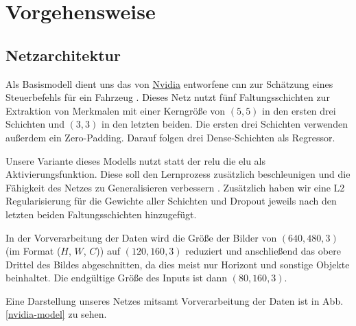 \chapter{Vorgehensweise}

\section{Netzarchitektur}

Als Basismodell dient uns das von \href{https://www.nvidia.com/en-us/}{Nvidia} entworfene \acs{cnn} zur Schätzung eines Steuerbefehls für ein Fahrzeug \cite{nvidia}. Dieses Netz nutzt fünf Faltungsschichten zur Extraktion von Merkmalen mit einer Kerngröße von $(5, 5)$ in den ersten drei Schichten und $(3, 3)$ in den letzten beiden. Die ersten drei Schichten verwenden außerdem ein Zero-Padding. Darauf folgen drei Dense-Schichten als Regressor.

Unsere Variante dieses Modells nutzt statt der \acs{relu} die \acs{elu} als Aktivierungsfunktion. Diese soll den Lernprozess zusätzlich beschleunigen und die Fähigkeit des Netzes zu Generalisieren verbessern \cite{elu}. Zusätzlich haben wir eine L2 Regularisierung für die Gewichte aller Schichten und Dropout jeweils nach den letzten beiden Faltungsschichten hinzugefügt.

In der Vorverarbeitung der Daten wird die Größe der Bilder von $(640, 480, 3)$ (im Format ($H$, $W$, $C$)) auf $(120, 160, 3)$ reduziert und anschließend das obere Drittel des Bildes abgeschnitten, da dies meist nur Horizont und sonstige Objekte beinhaltet. Die endgültige Größe des Inputs ist dann $(80, 160, 3)$.

Eine Darstellung unseres Netzes mitsamt Vorverarbeitung der Daten ist in Abb. \ref{nvidia-model} zu sehen.

